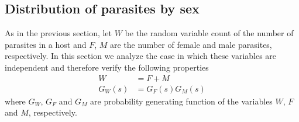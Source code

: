 \documentclass[12pt,a4paper]{article}
\theoremstyle{plain}%
\theoremstyle{definition}
\theoremstyle{remark}
\begin{document}
\subsection{Distribution of parasites by sex}
	As in the previous section, let $W$ be the random variable count of the number of parasites in a host and $F$, $M$ are the number of female and male parasites, respectively. 
	In this section we analyze the case in which these variables are independent and therefore verify the following properties
	\begin{equation}\label{independencia}
	\begin{split}
	W&=F+M\\
	G_W(s)&=G_F(s)G_M(s)
	\end{split}
	\end{equation}
	where $G_W$, $G_F$ and $G_M$ are probability generating function of the variables $W$, $F$ and $M$, respectively.
	 
\end{document}
